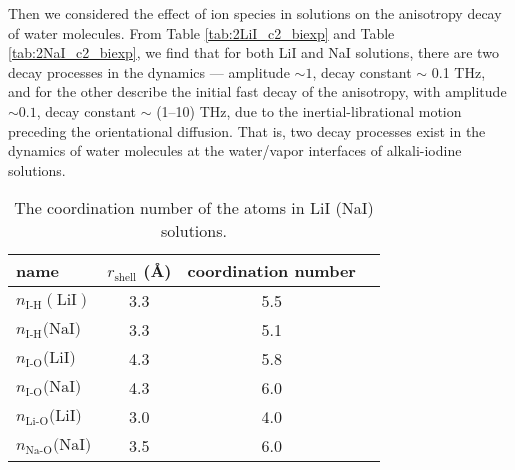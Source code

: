 Then we considered the effect of ion species in solutions on the anisotropy decay of water molecules.
From Table \ref{tab:2LiI_c2_biexp} and Table \ref{tab:2NaI_c2_biexp}, we find that 
for both LiI and NaI solutions, there are two decay processes in the dynamics --- amplitude $\sim 1$,
decay constant $\sim$ 0.1 THz, and for the other describe the initial fast decay 
of the anisotropy, with amplitude $\sim 0.1$, decay constant $\sim$ (1--10) THz, 
due to the inertial-librational motion preceding the orientational diffusion.
That is, two decay processes exist in the dynamics of water molecules 
at the water/vapor interfaces of alkali-iodine solutions. 
%
%
\begin{table}[H] %
\centering
\caption{\label{tab:table_CoordNo}%
The coordination number of the atoms in LiI (NaI) solutions.}
\begin{tabular}{lccc}
name & $r_\text{shell}$ (\AA) & coordination number \\
\hline
$n_\text{I-H}(\text{LiI})$ & 3.3 & 5.5 \\
$n_\text{I-H}(\text{NaI)}$ & 3.3 & 5.1 \\
$n_\text{I-O}(\text{LiI)}$ & 4.3 & 5.8 \\
$n_\text{I-O}(\text{NaI)}$ & 4.3 & 6.0 \\
$n_\text{Li-O}(\text{LiI)}$ & 3.0 & 4.0 \\
$n_\text{Na-O}(\text{NaI)}$ & 3.5 & 6.0 
\end{tabular}
\end{table}

